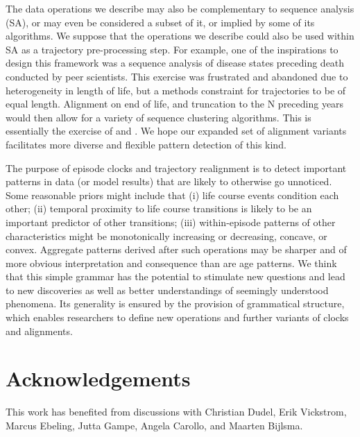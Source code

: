 \documentclass{article}
\begin{document}
The data operations we describe may also be complementary to sequence analysis (SA), or may even be considered a subset of it, or implied by some of its algorithms. We suppose that the operations we describe could also be used within SA as a trajectory pre-processing step. For example, one of the inspirations to design this framework was a sequence analysis of disease states preceding death conducted by peer scientists. This exercise was frustrated and abandoned due to heterogeneity in length of life, but a methods constraint for trajectories to be of equal length. Alignment on end of life, and truncation to the N preceding years would then allow for a variety of sequence clustering algorithms. This is essentially the exercise of \citet{potente2018disability} and \citet{raab2018pathways}. We hope our expanded set of alignment variants facilitates more diverse and flexible pattern detection of this kind.

The purpose of episode clocks and trajectory realignment is to detect important patterns in data (or model results) that are likely to otherwise go unnoticed. Some reasonable priors might include that (i) life course events condition each other; (ii) temporal proximity to life course transitions is likely to be an important predictor of other transitions; (iii) within-episode patterns of other characteristics might be monotonically increasing or decreasing, concave, or convex. Aggregate patterns derived after such operations may be sharper and of more obvious interpretation and consequence than are age patterns. We think that this simple grammar has the potential to stimulate new questions and lead to new discoveries as well as better understandings of seemingly understood phenomena. Its generality is ensured by the provision of grammatical structure, which enables researchers to define new operations and further variants of clocks and alignments.


\section*{Acknowledgements}
This work has benefited from discussions with Christian Dudel, Erik Vickstrom, Marcus Ebeling, Jutta Gampe, Angela Carollo, and Maarten Bijlsma. 

\FloatBarrier
\singlespacing

   
\end{document}
